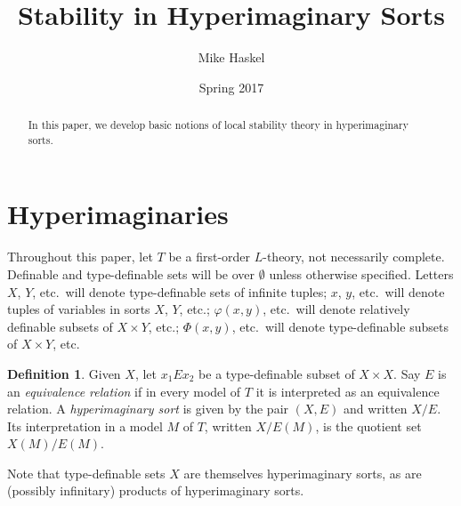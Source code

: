 \documentclass{article}
\title{Stability in Hyperimaginary Sorts}
\author{Mike Haskel}
\date{Spring 2017}
\theoremstyle{definition}
\newtheorem{definition}[theorem]{Definition}
\newcommand{\defterm}{\emph}
\begin{document}
\maketitle

\begin{abstract}
  In this paper, we develop basic notions of local stability theory in hyperimaginary sorts.
\end{abstract}

\section{Hyperimaginaries}

Throughout this paper, let $T$ be a first-order $L$-theory, not necessarily complete. Definable and type-definable sets will be over $\emptyset$ unless otherwise specified. Letters $X$, $Y$, etc.\ will denote type-definable sets of infinite tuples; $x$, $y$, etc.\ will denote tuples of variables in sorts $X$, $Y$, etc.; $\varphi(x,y)$, etc.\ will denote relatively definable subsets of $X \times Y$, etc.; $\Phi(x,y)$, etc.\ will denote type-definable subsets of $X \times Y$, etc.

\begin{definition}
  Given $X$, let $x_1 E x_2$ be a type-definable subset of $X \times X$. Say $E$ is an \defterm{equivalence relation} if in every model of $T$ it is interpreted as an equivalence relation. A \defterm{hyperimaginary sort} is given by the pair $(X,E)$ and written $X/E$. Its interpretation in a model $M$ of $T$, written $X/E(M)$, is the quotient set $X(M)/E(M)$.
\end{definition}

Note that type-definable sets $X$ are themselves hyperimaginary sorts, as are (possibly infinitary) products of hyperimaginary sorts.
\end{document}

